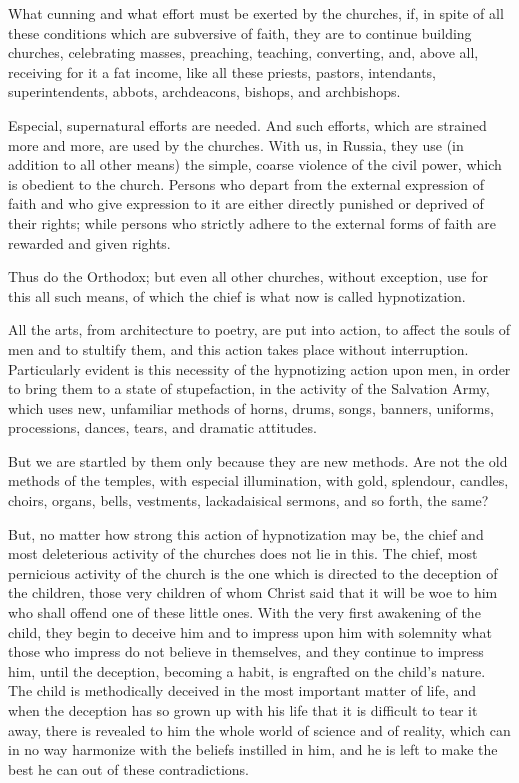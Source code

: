 \documentclass{book}
\begin{document}
What cunning and what effort must be exerted by the churches, if, in spite of all these conditions which are subversive of faith, they are to continue building churches, celebrating masses, preaching, teaching, converting, and, above all, receiving for it a fat income, like all these priests, pastors, intendants, superintendents, abbots, archdeacons, bishops, and archbishops.

Especial, supernatural efforts are needed. And such efforts, which are strained more and more, are used by the churches. With us, in Russia, they use (in addition to all other means) the simple, coarse violence of the civil power, which is obedient to the church. Persons who depart from the external expression of faith and who give expression to it are either directly punished or deprived of their rights; while persons who strictly adhere to the external forms of faith are rewarded and given rights.

Thus do the Orthodox; but even all other churches, without exception, use for this all such means, of which the chief is what now is called hypnotization.

All the arts, from architecture to poetry, are put into action, to affect the souls of men and to stultify them, and this action takes place without interruption. Particularly evident is this necessity of the hypnotizing action upon men, in order to bring them to a state of stupefaction, in the activity of the Salvation Army, which uses new, unfamiliar methods of horns, drums, songs, banners, uniforms, processions, dances, tears, and dramatic attitudes.

But we are startled by them only because they are new methods. Are not the old methods of the temples, with especial illumination, with gold, splendour, candles, choirs, organs, bells, vestments, lackadaisical sermons, and so forth, the same?

But, no matter how strong this action of hypnotization may be, the chief and most deleterious activity of the churches does not lie in this. The chief, most pernicious activity of the church is the one which is directed to the deception of the children, those very children of whom Christ said that it will be woe to him who shall offend one of these little ones. With the very first awakening of the child, they begin to deceive him and to impress upon him with solemnity what those who impress do not believe in themselves, and they continue to impress him, until the deception, becoming a habit, is engrafted on the child’s nature. The child is methodically deceived in the most important matter of life, and when the deception has so grown up with his life that it is difficult to tear it away, there is revealed to him the whole world of science and of reality, which can in no way harmonize with the beliefs instilled in him, and he is left to make the best he can out of these contradictions.
\end{document}
